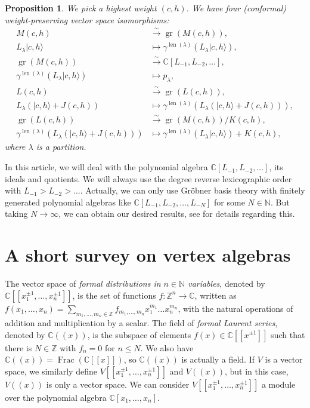 \documentclass[a4paper, 12pt, reqno]{amsart}
\newtheorem{proposition}[theorem]{Proposition}
\theoremstyle{remark}
\DeclareMathOperator{\len}{len}
\DeclareMathOperator{\gr}{gr}
\DeclareMathOperator{\Frac}{Frac}
\begin{document}
\begin{proposition}
  \label{prp:1}
  We pick a highest weight $(c, h)$.
  We have four (conformal) weight-preserving vector space isomorphisms:
  \begin{align*}
    M(c, h) &\xrightarrow{\sim} \gr(M(c, h)), \\
    L_{\lambda}|c, h\rangle &\mapsto \gamma^{\len(\lambda)}(L_{\lambda}|c, h\rangle), \\
    \gr(M(c, h)) &\xrightarrow{\sim} \mathbb{C}[L_{-1}, L_{-2}, \dots], \\
    \gamma^{\len(\lambda)}(L_{\lambda}|c, h\rangle) &\mapsto p_{\lambda}, \\
    L(c, h) &\xrightarrow{\sim} \gr(L(c, h)), \\
    L_{\lambda}(|c, h\rangle + J(c, h)) &\mapsto \gamma^{\len(\lambda)}(L_{\lambda}(|c, h\rangle + J(c, h))), \\
    \gr(L(c, h)) &\xrightarrow{\sim} \gr(M(c, h))/K(c, h), \\
    \gamma^{\len(\lambda)}(L_{\lambda}(|c, h\rangle + J(c, h))) &\mapsto \gamma^{\len(\lambda)}(L_{\lambda}|c, h\rangle) + K(c, h),
  \end{align*}
  where $\lambda$ is a partition.
\end{proposition}

In this article, we will deal with the polynomial algebra $\mathbb{C}[L_{-1}, L_{-2}, \dots]$, its ideals and quotients.
We will always use the degree reverse lexicographic order with $L_{-1} > L_{-2} > \dots$.
Actually, we can only use Gröbner basis theory with finitely generated polynomial algebras like $\mathbb{C}[L_{-1}, L_{-2}, \dots, L_{-N}]$ for some $N \in \mathbb{N}$.
But taking $N \to \infty$, we can obtain our desired results, see \cite{salazar_pbw_2024} for details regarding this.

\section{A short survey on vertex algebras}
\label{sec:short-survey-vertex}

The vector space of \emph{formal distributions in $n \in \mathbb{N}$ variables}, denoted by $\mathbb{C}[[x_1^{\pm1}, \dots, x_n^{\pm1}]]$, is the set of functions $f: \mathbb{Z}^n \to \mathbb{C}$, written as $f(x_1, \dots, x_n) = \sum_{m_1, \dots, m_n \in \mathbb{Z}}f_{m_1, \dots, m_n}x_1^{m_1}\dots x_n^{m_n}$, with the natural operations of addition and multiplication by a scalar.
The field of \emph{formal Laurent series}, denoted by $\mathbb{C}((x))$, is the subspace of elements $f(x) \in \mathbb{C}[[x^{\pm1}]]$ such that there is $N \in \mathbb{Z}$ with $f_n = 0$ for $n \le N$.
We also have $\mathbb{C}((x)) = \Frac(\mathbb{C}[[x]])$, so $\mathbb{C}((x))$ is actually a field.
If $V$ is a vector space, we similarly define $V[[x_1^{\pm1}, \dots, x_n^{\pm1}]]$ and $V((x))$, but in this case, $V((x))$ is only a vector space.
We can consider $V[[x_1^{\pm1}, \dots, x_n^{\pm1}]]$ a module over the polynomial algebra $\mathbb{C}[x_1, \dots, x_n]$.
\end{document}
